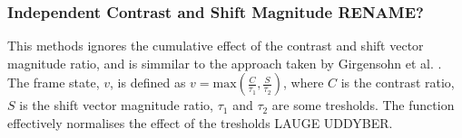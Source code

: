 \subsubsection{Independent Contrast and Shift Magnitude RENAME?}
%
This methods ignores the cumulative effect of the contrast and shift vector magnitude ratio, and is simmilar to the approach taken by Girgensohn et al. \cite{Girgensohn:2000:SAH:354401.354415}. The frame state, $v$, is defined as $v=\text{max}(\frac{C}{\tau_1}, \frac{S}{\tau_2})$,%
where $C$ is the contrast ratio, $S$ is the shift vector magnitude ratio, $\tau_1$ and $\tau_2$ are some tresholds.
The function effectively normalises the effect of the tresholds LAUGE UDDYBER.%
%
